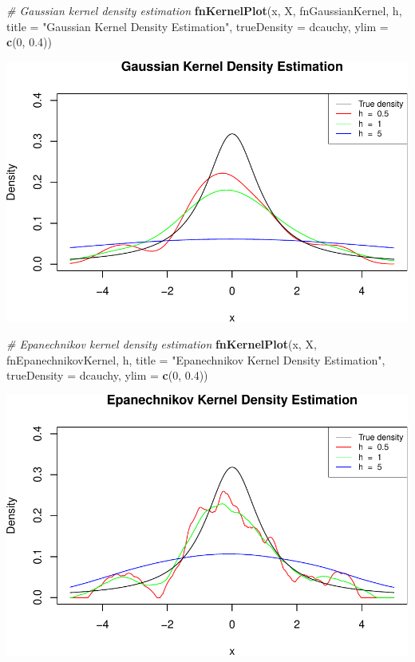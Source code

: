 \documentclass[10pt,]{article}
\newenvironment{Shaded}{\begin{snugshade}}{\end{snugshade}}
\newcommand{\KeywordTok}[1]{\textcolor[rgb]{0.13,0.29,0.53}{\textbf{{#1}}}}
\newcommand{\DataTypeTok}[1]{\textcolor[rgb]{0.13,0.29,0.53}{{#1}}}
\newcommand{\DecValTok}[1]{\textcolor[rgb]{0.00,0.00,0.81}{{#1}}}
\newcommand{\FloatTok}[1]{\textcolor[rgb]{0.00,0.00,0.81}{{#1}}}
\newcommand{\StringTok}[1]{\textcolor[rgb]{0.31,0.60,0.02}{{#1}}}
\newcommand{\CommentTok}[1]{\textcolor[rgb]{0.56,0.35,0.01}{\textit{{#1}}}}
\newcommand{\NormalTok}[1]{{#1}}
\begin{document}
\begin{Shaded}
\begin{Highlighting}[]
\CommentTok{# Gaussian kernel density estimation}
\KeywordTok{fnKernelPlot}\NormalTok{(x, X, fnGaussianKernel, h, }
             \DataTypeTok{title =} \StringTok{"Gaussian Kernel Density Estimation"}\NormalTok{,}
             \DataTypeTok{trueDensity =} \NormalTok{dcauchy, }\DataTypeTok{ylim =} \KeywordTok{c}\NormalTok{(}\DecValTok{0}\NormalTok{, }\FloatTok{0.4}\NormalTok{))}
\end{Highlighting}
\end{Shaded}

\includegraphics{project2_files/figure-latex/Kernel density estimation for Cauchy-2.pdf}

\begin{Shaded}
\begin{Highlighting}[]
\CommentTok{# Epanechnikov kernel density estimation}
\KeywordTok{fnKernelPlot}\NormalTok{(x, X, fnEpanechnikovKernel, h, }
             \DataTypeTok{title =} \StringTok{"Epanechnikov Kernel Density Estimation"}\NormalTok{,}
             \DataTypeTok{trueDensity =} \NormalTok{dcauchy, }\DataTypeTok{ylim =} \KeywordTok{c}\NormalTok{(}\DecValTok{0}\NormalTok{, }\FloatTok{0.4}\NormalTok{))}
\end{Highlighting}
\end{Shaded}

\includegraphics{project2_files/figure-latex/Kernel density estimation for Cauchy-3.pdf}
\end{document}
